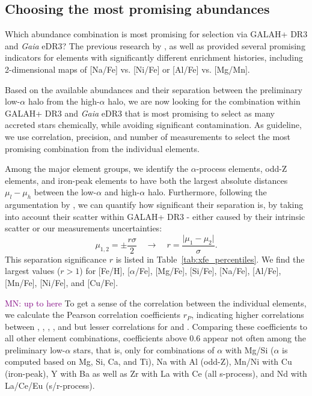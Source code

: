\documentclass[fleqn,usenatbib]{mnras}
\newcommand{\mkn}[1]{{\textcolor{purple}{MN: #1}}}
\newcommand{\Gaia}{\textit{Gaia}\xspace} %
\begin{document}
\subsection{Choosing the most promising abundances} \label{sec:choosing_chemical_selection}

Which abundance combination is most promising for selection via GALAH+ DR3 and \Gaia eDR3? The previous research by \citet{Nissen2010, Nissen2011}, \citet{Hawkins2015} as well as \citet{Hayes2018} provided several promising indicators for elements with significantly different enrichment histories, including 2-dimensional maps of [Na/Fe] vs. [Ni/Fe] or [Al/Fe] vs. [Mg/Mn].

Based on the available abundances and their separation between the preliminary low-$\alpha$ halo from the high-$\alpha$ halo, we are now looking for the combination within GALAH+ DR3 and \Gaia eDR3 that is most promising to select as many accreted stars chemically, while avoiding significant contamination. As guideline, we use correlation, precision, and number of measurements to select the most promising combination from the individual elements.

Among the major element groups, we identify the $\alpha$-process elements, odd-Z elements, and iron-peak elements to have both the largest absolute distances $\mu_l - \mu_h$ between the low-$\alpha$ and high-$\alpha$ halo. Furthermore, following the argumentation by \citet{Lindegren2013}, we can quantify how significant their separation is, by taking into account their scatter within GALAH+ DR3 - either caused by their intrinsic scatter or our measurements uncertainties: 
\begin{equation}
\mu_{1,2} = \pm \frac{r \sigma}{2} \quad \rightarrow \quad r = \frac{\vert \mu_1 - \mu_2 \vert}{\sigma}.
\end{equation}
This separation significance $r$ is listed in Table~\ref{tab:xfe_percentiles}. We find the largest values ($r > 1$) for [Fe/H], [$\alpha$/Fe], [Mg/Fe], [Si/Fe], [Na/Fe], [Al/Fe], [Mn/Fe], [Ni/Fe], and [Cu/Fe]. 

\mkn{up to here}
To get a sense of the correlation between the individual elements, we calculate the Pearson correlation coefficients $r_P$, indicating higher correlations between , , , , and  but lesser correlations for  and . Comparing these coefficients to all other element combinations, coefficients above 0.6 appear not often among the preliminary low-$\alpha$ stars, that is, only for combinations of $\alpha$ with Mg/Si ($\alpha$ is computed based on Mg, Si, Ca, and Ti), Na with Al (odd-Z), Mn/Ni with Cu (iron-peak), Y with Ba as well as Zr with La with Ce (all s-process), and Nd with La/Ce/Eu (s/r-process).
\end{document}
